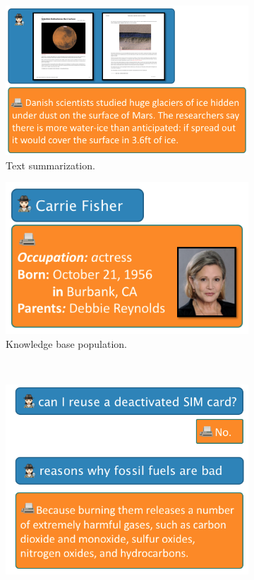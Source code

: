 \begin{figure}
  \centering
  \begin{subfigure}{0.55\textwidth}
    \includegraphics[width=\textwidth]{figures/overview-summarization}
    \caption{\label{fig:intro:overview-summarization} Text summarization. }
  \end{subfigure}
  \begin{subfigure}{0.45\textwidth}
    \includegraphics[width=\textwidth]{figures/overview-kbp}
    \caption{\label{fig:intro:overview-kbp} Knowledge base population.}
  \end{subfigure} \\
  \begin{subfigure}{0.55\textwidth}%
    \includegraphics[width=\textwidth]{figures/overview-qa}

\end{subfigure}
\end{figure}
